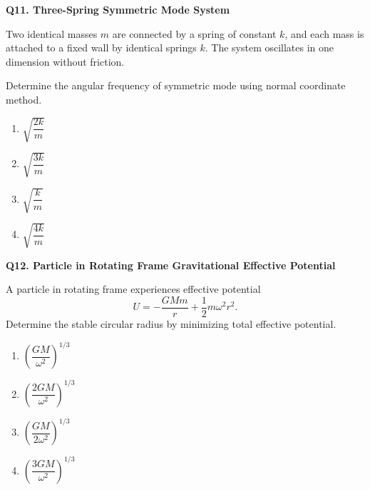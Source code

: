 \documentclass[12pt]{article}
\begin{document}
\textbf{Q11. Three-Spring Symmetric Mode System}



Two identical masses $m$ are connected by a spring of constant $k$, and each mass is attached to a fixed wall by identical springs $k$. The system oscillates in one dimension without friction.

Determine the angular frequency of symmetric mode using normal coordinate method.

\begin{center}
\end{center}

\begin{enumerate}
\item[(A)] $\sqrt{\dfrac{2k}{m}}$
\item[(B)] $\sqrt{\dfrac{3k}{m}}$
\item[(C)] $\sqrt{\dfrac{k}{m}}$
\item[(D)] $\sqrt{\dfrac{4k}{m}}$
\end{enumerate}

\textbf{Q12. Particle in Rotating Frame Gravitational Effective Potential}

A particle in rotating frame experiences effective potential
\[
U = -\frac{GMm}{r} + \frac12 m\omega^2 r^2.
\]
Determine the stable circular radius by minimizing total effective potential.

\begin{enumerate}
\item[(A)] $\left(\dfrac{GM}{\omega^2}\right)^{1/3}$
\item[(B)] $\left(\dfrac{2GM}{\omega^2}\right)^{1/3}$
\item[(C)] $\left(\dfrac{GM}{2\omega^2}\right)^{1/3}$
\item[(D)] $\left(\dfrac{3GM}{\omega^2}\right)^{1/3}$
\end{enumerate}
\end{document}
